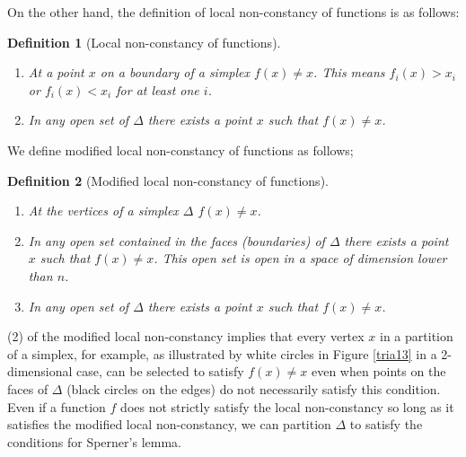 \documentclass[reqno]{amsart}
\newtheorem{defn}{Definition}
\begin{document}
On the other hand, the definition of local non-constancy of functions is as follows:
\begin{defn}[Local non-constancy of functions]
\begin{enumerate}
	\item At a point $x$ on a boundary of a simplex $f(x)\neq x$. This means $f_i(x)>x_i$ or $f_i(x)<x_i$ for at least one $i$. 
	\item In any open set of $\Delta$ there exists a point $x$ such that $f(x)\neq x$.
\end{enumerate}
\end{defn}
We define modified local non-constancy of functions as follows;
\begin{defn}[Modified local non-constancy of functions]
\begin{enumerate}
\item At the vertices of a simplex $\Delta$ $f(x)\neq x$.
\item In any open set contained in the faces (boundaries) of $\Delta$ there exists a point $x$ such that $f(x)\neq x$. This open set is open in a space of dimension lower than $n$.
\item In any open set of $\Delta$ there exists a point $x$ such that $f(x)\neq x$.
\end{enumerate}
\end{defn}
(2) of the modified local non-constancy implies that every vertex $x$ in a partition of a simplex, for example, as illustrated by white circles in Figure \ref{tria13} in a 2-dimensional case, can be selected to satisfy $f(x)\neq x$ even when points on the faces of $\Delta$ (black circles on the edges) do not necessarily satisfy this condition. Even if a function $f$ does not strictly satisfy the local non-constancy so long as it satisfies the modified local non-constancy, we can partition $\Delta$ to satisfy the conditions for Sperner's lemma.
\end{document}
